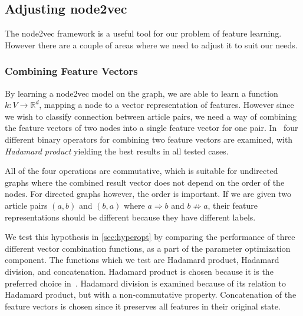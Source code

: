 \subsection{Adjusting node2vec}
The node2vec framework is a useful tool for our problem of feature learning. However there are a couple of areas where we need to adjust it to suit our needs.

\subsubsection{Combining Feature Vectors}\label{subsub:combining_feature_vectors}
By learning a node2vec model on the graph, we are able to learn a function $k:V \to \mathbb{R}^d$, mapping a node to a vector representation of features. However since we wish to classify connection between article pairs, we need a way of combining the feature vectors of two nodes into a single feature vector for one pair. In~\cite{node2vec} four different binary operators for combining two feature vectors are examined, with \emph{Hadamard product} yielding the best results in all tested cases.

All of the four operations are commutative, which is suitable for undirected graphs where the combined result vector does not depend on the order of the nodes. For directed graphs however, the order is important. If we are given two article pairs $(a,b)$ and $(b,a)$ where $a \Rightarrow b$ and $b \not \Rightarrow a$, their feature representations should be different because they have different labels. 

We test this hypothesis in \cref{sec:hyperopt} by comparing the performance of three different vector combination functions, as a part of the parameter optimization component. The functions which we test are Hadamard product, Hadamard division, and concatenation. Hadamard product is chosen because it is the preferred choice in~\cite{node2vec}. Hadamard division is examined because of its relation to Hadamard product, but with a non-commutative property. Concatenation of the feature vectors is chosen since it preserves all features in their original state.


